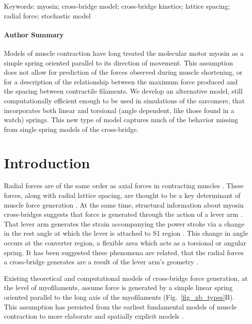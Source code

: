 \documentclass[]{article}
\begin{document}
Keywords: myosin; cross-bridge model; cross-bridge kinetics; lattice spacing; radial force; stochastic model 

\paragraph*{Author Summary} %
Models of muscle contraction have long treated the molecular motor myosin as a simple spring oriented parallel to its direction of movement. 
This assumption does not allow for prediction of the forces observed during muscle shortening, or for a description of the relationship between the maximum force produced and the spacing between contractile filaments. 
We develop an alternative model, still computationally efficient enough to be used in simulations of the sarcomere, that incorporates both linear and torsional (angle dependent, like those found in a watch) springs. 
This new type of model captures much of the behavior missing from single spring models of the cross-bridge.


\section*{Introduction} %

Radial forces are of the same order as axial forces in contracting muscles \citep{Cecchi1990, Millman1998}. 
These forces, along with radial lattice spacing, are thought to be a key determinant of muscle force generation \citep{Fuchs2005}. 
At the same time, structural information about myosin cross-bridges suggests that force is generated through the action of a lever arm \citep{Rayment1993, Uyeda1996, Huxley2000}.
That lever arm generates the strain accompanying the power stroke via a change in the rest angle at which the lever is attached to S1 region \citep{Huxley2000, Houdusse2001}. 
This change in angle occurs at the converter region, a flexible area which acts as a torsional or angular spring. 
It has been suggested these phenomena are related, that the radial forces a cross-bridge generates are a result of the lever arm's geometry \citep{Schoenberg1980b}. 

Existing theoretical and computational models of cross-bridge force generation, at the level of myofilaments, assume force is generated by a simple linear spring oriented parallel to the long axis of the myofilaments (Fig.~\ref{fig_xb_types}B).  %
This assumption has persisted from the earliest fundamental models of muscle contraction to more elaborate and spatially explicit models \citep{Huxley1957, Daniel1998, Chase2004, Tanner2007, Campbell2009}.  
\end{document}
